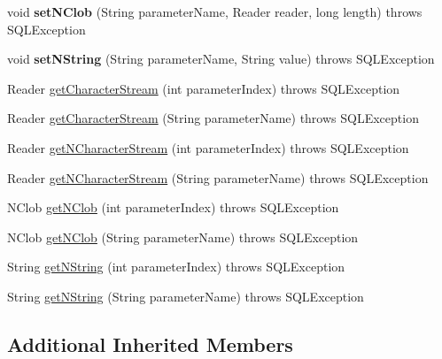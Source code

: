 \begin{DoxyCompactItemize}
void {\bfseries set\+N\+Clob} (String parameter\+Name, Reader reader, long length)  throws S\+Q\+L\+Exception 
\item 
\mbox{\label{classcom_1_1mysql_1_1jdbc_1_1_j_d_b_c4_callable_statement_a8ac66fd3fe65e35c57c8ded3fea3bfa3}} 
void {\bfseries set\+N\+String} (String parameter\+Name, String value)  throws S\+Q\+L\+Exception 
\item 
Reader \mbox{\hyperlink{classcom_1_1mysql_1_1jdbc_1_1_j_d_b_c4_callable_statement_a7cba01d0c78253ccd214d135ad80f940}{get\+Character\+Stream}} (int parameter\+Index)  throws S\+Q\+L\+Exception 
\item 
Reader \mbox{\hyperlink{classcom_1_1mysql_1_1jdbc_1_1_j_d_b_c4_callable_statement_a15b4e03ffebdf0911e1d94141b6caa9d}{get\+Character\+Stream}} (String parameter\+Name)  throws S\+Q\+L\+Exception 
\item 
Reader \mbox{\hyperlink{classcom_1_1mysql_1_1jdbc_1_1_j_d_b_c4_callable_statement_ab6d3df8d45cf6f39eddc72d68d0b9e58}{get\+N\+Character\+Stream}} (int parameter\+Index)  throws S\+Q\+L\+Exception 
\item 
Reader \mbox{\hyperlink{classcom_1_1mysql_1_1jdbc_1_1_j_d_b_c4_callable_statement_ab33ce6e6788ccee8df3cc52bb4e043ec}{get\+N\+Character\+Stream}} (String parameter\+Name)  throws S\+Q\+L\+Exception 
\item 
N\+Clob \mbox{\hyperlink{classcom_1_1mysql_1_1jdbc_1_1_j_d_b_c4_callable_statement_a0c1a156017f1eb908fcfca7c724edacb}{get\+N\+Clob}} (int parameter\+Index)  throws S\+Q\+L\+Exception 
\item 
N\+Clob \mbox{\hyperlink{classcom_1_1mysql_1_1jdbc_1_1_j_d_b_c4_callable_statement_aefb73c39ced84e5e0e96825272f0017f}{get\+N\+Clob}} (String parameter\+Name)  throws S\+Q\+L\+Exception 
\item 
String \mbox{\hyperlink{classcom_1_1mysql_1_1jdbc_1_1_j_d_b_c4_callable_statement_a76edc16d913bef376e7262364251feb4}{get\+N\+String}} (int parameter\+Index)  throws S\+Q\+L\+Exception 
\item 
String \mbox{\hyperlink{classcom_1_1mysql_1_1jdbc_1_1_j_d_b_c4_callable_statement_ad92f78a50282fcf768519d0603c7a1ce}{get\+N\+String}} (String parameter\+Name)  throws S\+Q\+L\+Exception 
\end{DoxyCompactItemize}
\subsection*{Additional Inherited Members}


